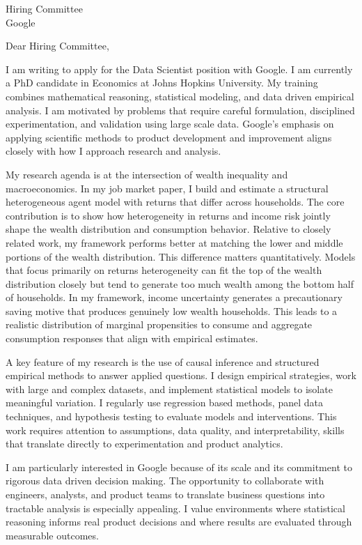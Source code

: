 \documentclass[11pt]{letter}
\begin{document}
\begin{letter}{Hiring Committee \\ Google}

\opening{Dear Hiring Committee,}

I am writing to apply for the Data Scientist position with Google. I am currently a PhD candidate in Economics at Johns Hopkins University. My training combines mathematical reasoning, statistical modeling, and data driven empirical analysis. I am motivated by problems that require careful formulation, disciplined experimentation, and validation using large scale data. Google’s emphasis on applying scientific methods to product development and improvement aligns closely with how I approach research and analysis.

My research agenda is at the intersection of wealth inequality and macroeconomics. In my job market paper, I build and estimate a structural heterogeneous agent model with returns that differ across households. The core contribution is to show how heterogeneity in returns and income risk jointly shape the wealth distribution and consumption behavior. Relative to closely related work, my framework performs better at matching the lower and middle portions of the wealth distribution. This difference matters quantitatively. Models that focus primarily on returns heterogeneity can fit the top of the wealth distribution closely but tend to generate too much wealth among the bottom half of households. In my framework, income uncertainty generates a precautionary saving motive that produces genuinely low wealth households. This leads to a realistic distribution of marginal propensities to consume and aggregate consumption responses that align with empirical estimates.

A key feature of my research is the use of causal inference and structured empirical methods to answer applied questions. I design empirical strategies, work with large and complex datasets, and implement statistical models to isolate meaningful variation. I regularly use regression based methods, panel data techniques, and hypothesis testing to evaluate models and interventions. This work requires attention to assumptions, data quality, and interpretability, skills that translate directly to experimentation and product analytics.

I am particularly interested in Google because of its scale and its commitment to rigorous data driven decision making. The opportunity to collaborate with engineers, analysts, and product teams to translate business questions into tractable analysis is especially appealing. I value environments where statistical reasoning informs real product decisions and where results are evaluated through measurable outcomes.


\end{letter}
\end{document}
